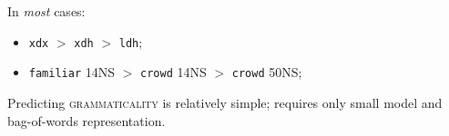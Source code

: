 \documentclass[handout,xcolor={dvipsnames}]{beamer}
\newcommand{\feat}[1]{\textsc{#1}}
\newcommand{\param}[1]{\texttt{#1}}
\begin{document}
\begin{frame}
\begin{table}[htb!]
\begin{center}
\end{center}
\end{table}


\pause
In \textit{most} cases:
\begin{itemize}
\pause
\item \param{xdx} $>$ \param{xdh} $>$ \param{ldh};
\pause
\item \param{familiar} 14NS $>$ \param{crowd} 14NS $>$ \param{crowd} 50NS;
\end{itemize}

\vspace{1em}

\pause
Predicting \feat{grammaticality} is relatively simple; requires only small model and bag-of-words representation. \\

\end{frame}

\end{document}
